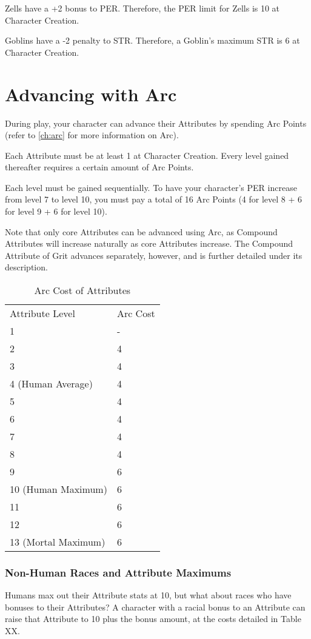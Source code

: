 \documentclass[oneside,11pt,english]{book}
\begin{document}
Zells have a +2 bonus to PER. Therefore, the PER limit for Zells is 10 at Character Creation. 

 
Goblins have a -2 penalty to STR. Therefore, a Goblin’s maximum STR is 6 at Character Creation. 
\section{Advancing with Arc}
During play, your character can advance their Attributes by spending Arc Points (refer to \autoref{ch:arc} for 
more information on Arc). 
 

Each Attribute must be at least 1 at Character Creation. Every level gained thereafter requires a certain 
amount of Arc Points. 

 
Each level must be gained sequentially. To have your character’s PER increase from level 7 to level 10, 
you must pay a total of 16 Arc Points (4 for level 8 + 6 for level 9 + 6 for level 10). 
 

Note that only core Attributes can be advanced using Arc, as Compound Attributes will increase naturally 
as core Attributes increase. The Compound Attribute of Grit advances separately, however, and is further 
detailed under its description. 
\begin{table}
	\caption{Arc Cost of Attributes}
	\label{tab:AttribsArcCost}
\begin{tabu} spread 0pt {Xl}
Attribute Level & Arc Cost\\
1& -                        \\
2& 4                        \\
3& 4                        \\
4 (Human Average)& 4        \\
5& 4                        \\
6& 4                        \\
7& 4                        \\
8& 4                        \\
9& 6                        \\
10 (Human Maximum)& 6       \\
11& 6                       \\
12& 6                       \\
13 (Mortal Maximum)& 6      \\
\end{tabu}
\end{table}
\subsubsection{Non-Human Races and Attribute Maximums}
Humans max out their Attribute stats at 10, but what about races who have bonuses to their Attributes? A 
character with a racial bonus to an Attribute can raise that Attribute to 10 plus the bonus amount, at the 
costs detailed in Table XX. 
\end{document}
